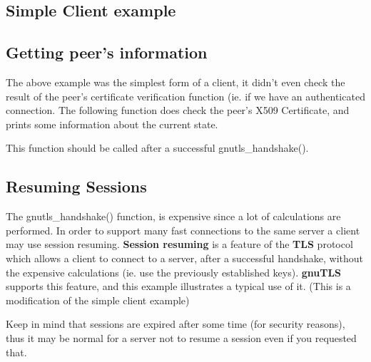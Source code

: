 \documentclass{article}
\begin{document}
\subsection{Simple Client example}


\subsection{Getting peer's information}
\par The above example was the simplest form of a client, it didn't even check
the result of the peer's certificate verification function (ie. if we have
an authenticated connection. The following function does check the peer's X509
Certificate, and prints some information about the current state.
\par
This function should be called after a successful gnutls\_handshake().



\subsection{Resuming Sessions}
\par
The gnutls\_handshake() function, is expensive since
a lot of calculations are performed. In order to support many fast connections to
the same server a client may use session resuming. {\bf Session resuming} is a
feature of the {\bf TLS} protocol which allows a client to connect to a server,
after a successful handshake, without the expensive calculations (ie. use the previously
established keys). {\bf gnuTLS} supports this feature, and this example illustrates a
typical use of it. (This is a modification of the simple client example)

\par
Keep in mind that sessions are expired after some time (for security reasons), thus
it may be normal for a server not to resume a session even if you requested that.





\end{document}
